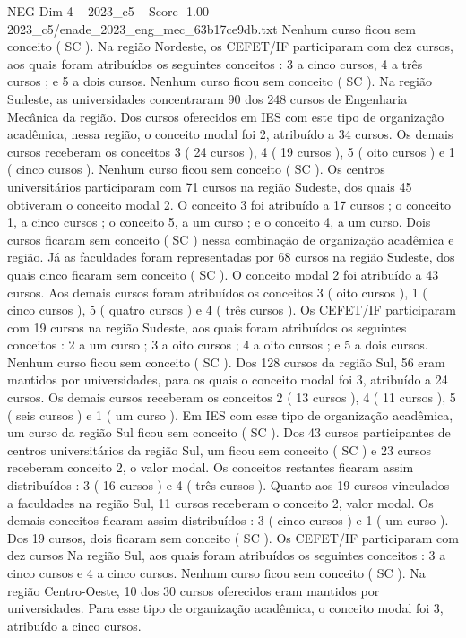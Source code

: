 \begin{textsample}{NEG Dim 4 – 2023\_c5 – Score -1.00 – 2023\_c5/enade\_2023\_eng\_mec\_63b17ce9db.txt}
Nenhum curso ficou sem conceito ( SC ).
Na região Nordeste, os CEFET/IF participaram com dez cursos, aos quais foram atribuídos os seguintes conceitos : 3 a cinco cursos, 4 a três cursos ; e 5 a dois cursos.
Nenhum curso ficou sem conceito ( SC ).
Na região Sudeste, as universidades concentraram 90 dos 248 cursos de Engenharia Mecânica da região.
Dos cursos oferecidos em IES com este tipo de organização acadêmica, nessa região, o conceito modal foi 2, atribuído a 34 cursos.
Os demais cursos receberam os conceitos 3 ( 24 cursos ), 4 ( 19 cursos ), 5 ( oito cursos ) e 1 ( cinco cursos ).
Nenhum curso ficou sem conceito ( SC ).
Os centros universitários participaram com 71 cursos na região Sudeste, dos quais 45 obtiveram o conceito modal 2.
O conceito 3 foi atribuído a 17 cursos ; o conceito 1, a cinco cursos ; o conceito 5, a um curso ; e o conceito 4, a um curso.
Dois cursos ficaram sem conceito ( SC ) nessa combinação de organização acadêmica e região.
Já as faculdades foram representadas por 68 cursos na região Sudeste, dos quais cinco ficaram sem conceito ( SC ).
O conceito modal 2 foi atribuído a 43 cursos.
Aos demais cursos foram atribuídos os conceitos 3 ( oito cursos ), 1 ( cinco cursos ), 5 ( quatro cursos ) e 4 ( três cursos ).
Os CEFET/IF participaram com 19 cursos na região Sudeste, aos quais foram atribuídos os seguintes conceitos : 2 a um curso ; 3 a oito cursos ; 4 a oito cursos ; e 5 a dois cursos.
Nenhum curso ficou sem conceito ( SC ).
Dos 128 cursos da região Sul, 56 eram mantidos por universidades, para os quais o conceito modal foi 3, atribuído a 24 cursos.
Os demais cursos receberam os conceitos 2 ( 13 cursos ), 4 ( 11 cursos ), 5 ( seis cursos ) e 1 ( um curso ).
Em IES com esse tipo de organização acadêmica, um curso da região Sul ficou sem conceito ( SC ).
Dos 43 cursos participantes de centros universitários da região Sul, um ficou sem conceito ( SC ) e 23 cursos receberam conceito 2, o valor modal.
Os conceitos restantes ficaram assim distribuídos : 3 ( 16 cursos ) e 4 ( três cursos ).
Quanto aos 19 cursos vinculados a faculdades na região Sul, 11 cursos receberam o conceito 2, valor modal.
Os demais conceitos ficaram assim distribuídos : 3 ( cinco cursos ) e 1 ( um curso ).
Dos 19 cursos, dois ficaram sem conceito ( SC ).
Os CEFET/IF participaram com dez cursos Na região Sul, aos quais foram atribuídos os seguintes conceitos : 3 a cinco cursos e 4 a cinco cursos.
Nenhum curso ficou sem conceito ( SC ).
Na região Centro-Oeste, 10 dos 30 cursos oferecidos eram mantidos por universidades.
Para esse tipo de organização acadêmica, o conceito modal foi 3, atribuído a cinco cursos.

\end{textsample}
